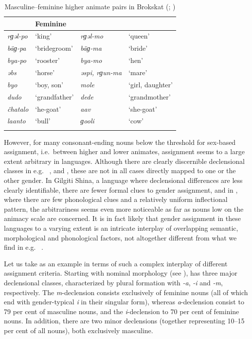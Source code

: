 \documentclass[output=collectionpaper]{langsci/langscibook}
\begin{document}
\begin{table}
\begin{tabularx}{0.9\textwidth}{XXXX}
\lsptoprule
\multicolumn{2}{X}{Masculine} & \multicolumn{2}{X}{Feminine}\\
\midrule
\itshape rɡəl-po & `king' & \itshape rɡəl-mo & `queen'\\
\itshape bäɡ-pa & `bridegroom' & \itshape bäɡ-ma & `bride'\\
\itshape bya-po & `rooster' & \itshape bya-mo & `hen'\\
\itshape əbs & `horse' & \itshape əspi, rɡun-ma & `mare'\\
\itshape byo & `boy, son' & \itshape mole & `girl, daughter'\\
\itshape dudo & `grandfather' & \itshape dede & `grandmother'\\
\itshape čhatalo & `he-goat' & \itshape aav & `she-goat'\\
\itshape laanto & `bull' & \itshape ɡooli & `cow'\\
\lspbottomrule
\end{tabularx}
\caption{Masculine--feminine higher animate pairs in Brokskat (\citealt[38--39]{Ramaswami1982}; \citealt[56--58, 80]{Sharma1998})}
\label{tab:Lilje:6}
\end{table}


However, for many consonant-ending nouns below the threshold for sex-based assignment, i.e.\ between higher and lower animates, assignment seems to a large extent arbitrary in  languages. Although there are clearly discernible declensional classes in e.g.\  ,  and , these are not in all cases directly mapped to one or the other gender. In Gilgiti Shina, a language where declensional differences are less clearly identifiable, there are fewer formal clues to gender assignment, and in , where there are few phonological clues and a relatively uniform inflectional pattern, the arbitrariness seems even more noticeable as far as nouns low on the animacy scale are concerned. It is in fact likely that gender assignment in these languages to a varying extent is an intricate interplay of overlapping semantic, morphological and phonological factors, not altogether different from what we find in e.g.\  \citep[49]{Corbett1991}.

Let us take  as an example in terms of such a complex interplay of different assignment criteria. Starting with nominal morphology (see ),  has three major declensional classes, characterized by plural formation with \textit{\nobreakdash-a}, \textit{{}-i} and \textit{\nobreakdash-m}, respectively. The \textit{m}{}-declension consists exclusively of feminine nouns (all of which end with gender-typical \textit{i} in their singular form), whereas \textit{a}\hyp{}declension consist to 79 per cent of masculine nouns, and the \textit{i}{}-declension to 70 per cent of feminine nouns. In addition, there are two minor declensions (together representing 10--15 per cent of all nouns), both exclusively masculine.
\end{document}
